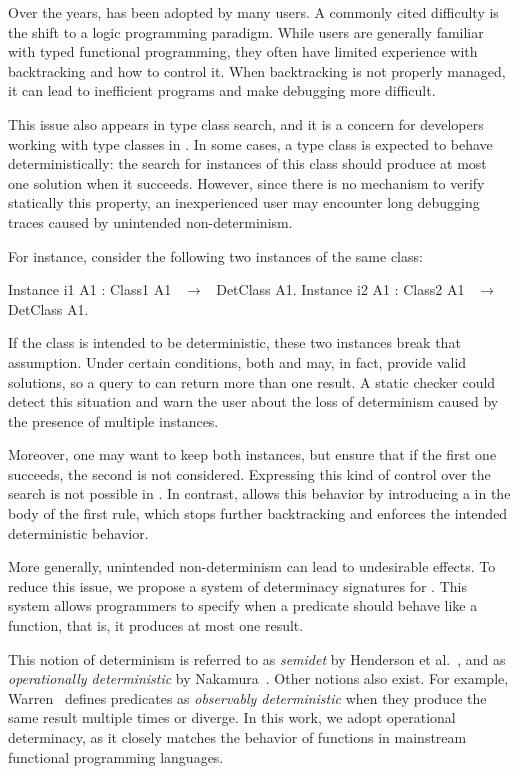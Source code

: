 Over the years, \elpi has been adopted by many \rocq users. A commonly cited
difficulty is the shift to a logic programming paradigm. While \rocq users are
generally familiar with typed functional programming, they often have limited
experience with backtracking and how to control it. When backtracking is not
properly managed, it can lead to inefficient programs and make debugging more
difficult.

This issue also appears in type class search, and it is a concern for developers
working with type classes in \rocq. In some cases, a type class is expected to
behave deterministically: the search for instances of this class should produce
at most one solution when it succeeds. However, since there is no mechanism to
verify statically this property, an inexperienced user may encounter long debugging traces
caused by unintended non-determinism.

For instance, consider the following two instances of the same class:

\begin{coqcode}
Instance i1 A1 : Class1 A1 ~$\to$~ DetClass A1.
Instance i2 A1 : Class2 A1 ~$\to$~ DetClass A1.
\end{coqcode}

If the class  is intended to be deterministic, these two instances
break that assumption. Under certain conditions, both  and  may,
in fact,
provide valid solutions, so a query to  can return more than one
result. A static checker could detect this situation and warn the user about the
loss of determinism caused by the presence of multiple instances.

Moreover, one may want to keep both instances, but ensure that if the first one
succeeds, the second is not considered. Expressing this kind of control over the
search is not possible in \rocq. In contrast, \elpi allows this behavior by
introducing a \cut in the body of the first rule, which stops further
backtracking and enforces the intended deterministic behavior.

More generally, unintended non-determinism can lead to undesirable effects.
To reduce this issue, we propose a system of determinacy signatures for \elpi. 
This system
allows programmers to specify when a predicate should behave like a function,
that is, it produces at most one result.

This notion of determinism is referred to as \emph{semidet} by
Henderson et al.~\cite{henderson1996}, and as \emph{operationally
deterministic} by Nakamura~\cite{nakamura1986}. Other notions also exist. For
example, Warren~\cite{warren1989} defines predicates as \emph{observably
deterministic} when they produce the same result multiple times or diverge. In
this work, we adopt operational determinacy, as it closely matches the behavior
of functions in mainstream functional programming languages.

